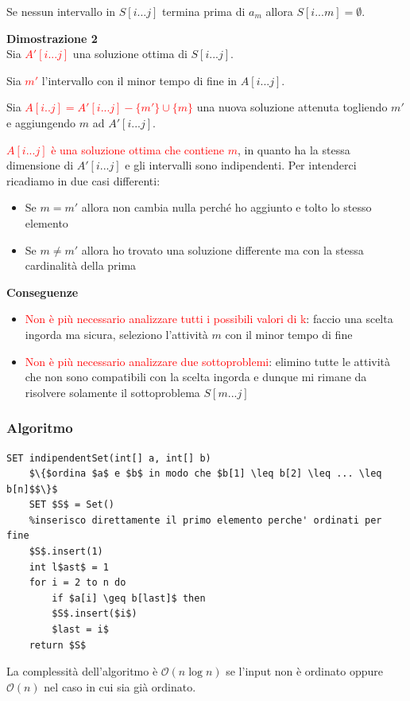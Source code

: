 \documentclass[../cheatSheetAlgoritmi.tex]{subfiles}
\begin{document}
Se nessun intervallo in $S[i...j]$ termina prima di $a_m$ allora $S[i...m] = \emptyset$.

\bigskip

\textbf{Dimostrazione 2}\\
Sia \textcolor{red}{$A'[i...j]$} una soluzione ottima di $S[i...j]$.

Sia \textcolor{red}{$m'$} l'intervallo con il minor tempo di fine in $A[i...j]$.

Sia \textcolor{red}{$A[i..j] = A'[i...j] - \{ m' \} \cup \{ m \}$} una nuova soluzione attenuta togliendo $m'$ e aggiungendo $m$ ad $A'[i...j]$.

\textcolor{red}{$A[i...j]$ è una soluzione ottima che contiene $m$}, in quanto ha la stessa dimensione di $A'[i...j]$ e gli intervalli sono indipendenti. Per intenderci ricadiamo in due casi differenti:
\begin{itemize}
	\item Se $m = m'$ allora non cambia nulla perché ho aggiunto e tolto lo stesso elemento
	\item Se $m \neq m'$ allora ho trovato una soluzione differente ma con la stessa cardinalità della prima 
\end{itemize}
\textbf{Conseguenze}

\begin{itemize}
	\item \textcolor{red}{Non è più necessario analizzare tutti i possibili valori di k}: faccio una scelta ingorda ma sicura, seleziono l'attività $m$ con il minor tempo di fine
	\item \textcolor{red}{Non è più necessario analizzare due sottoproblemi}: elimino tutte le attività che non sono compatibili con la scelta ingorda e dunque mi rimane da risolvere solamente il sottoproblema $S[m...j]$
\end{itemize}
\subsubsection{Algoritmo}
\begin{lstlisting}[caption=indipendent Set (Greedy)]
SET indipendentSet(int[] a, int[] b)
	$\{$ordina $a$ e $b$ in modo che $b[1] \leq b[2] \leq ... \leq b[n]$$\}$
	SET $S$ = Set()
	%inserisco direttamente il primo elemento perche' ordinati per fine
	$S$.insert(1) 
	int l$ast$ = 1
	for i = 2 to n do
		if $a[i] \geq b[last]$ then
		$S$.insert($i$)
		$last = i$
	return $S$
\end{lstlisting}
La complessità dell'algoritmo è $\mathcal{O}(n\log{n})$ se l'input non è ordinato oppure $\mathcal{O}(n)$ nel caso in cui sia già ordinato.
\end{document}
